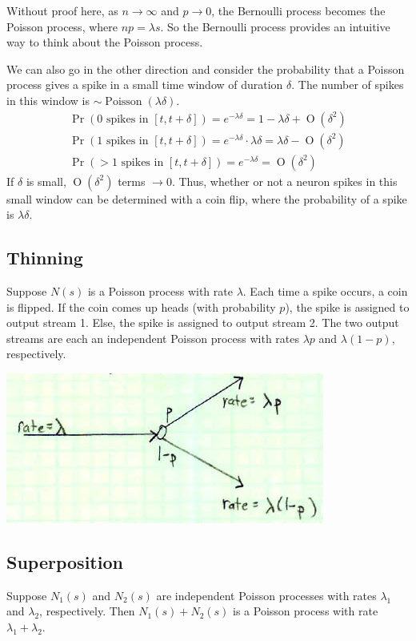 \documentclass[11pt]{article}
\DeclareMathOperator{\Poisson}{Poisson}
\DeclareMathOperator{\Order}{O}
\begin{document}
Without proof here, as $n \rightarrow \infty$ and $p \rightarrow 0$, the Bernoulli process becomes the Poisson process, where
 $n p = \lambda s$. So the Bernoulli process provides an intuitive way to think about the Poisson process.

We can also go in the other direction and consider the probability that a Poisson process gives a spike in a small
time window of duration $\delta$. The number of spikes in this window is $\sim \Poisson(\lambda \delta)$.
\begin{gather*}
\Pr\left(0 \text{ spikes in } [t, t + \delta]\right) = e^{-\lambda \delta} = \boxed{1 - \lambda \delta} + \Order(\delta^2) \\
\Pr\left(1 \text{ spikes in } [t, t + \delta]\right) = e^{-\lambda \delta} \cdot \lambda \delta = \boxed{\lambda \delta} - \Order(\delta^2) \\
\Pr\left( >1 \text{ spikes in } [t, t + \delta]\right) = e^{-\lambda \delta} = \Order(\delta^2)
\end{gather*}
If $\delta$ is small, $\Order(\delta^2)$ terms $\rightarrow 0$. Thus, whether or not a neuron spikes in this small window can
be determined with a coin flip, where the probability of a spike is $\lambda \delta$.

\subsection{Thinning}
Suppose $N(s)$ is a Poisson process with rate $\lambda$. Each time a spike occurs, a coin is flipped. If the coin comes up
heads (with probability $p$), the spike is assigned to output stream 1. Else, the spike is assigned to output stream 2. The two
output streams are each an independent Poisson process with rates $\lambda p$ and $\lambda (1-p)$, respectively.

\begin{center}
\includegraphics[scale=0.5]{Figure8.jpg}
\end{center}

\subsection{Superposition}
Suppose $N_1(s)$ and $N_2(s)$ are independent Poisson processes with rates $\lambda_1$ and $\lambda_2$, respectively. Then
$N_1(s) + N_2(s)$ is a Poisson process with rate $\lambda_1 + \lambda_2$.
\end{document}
